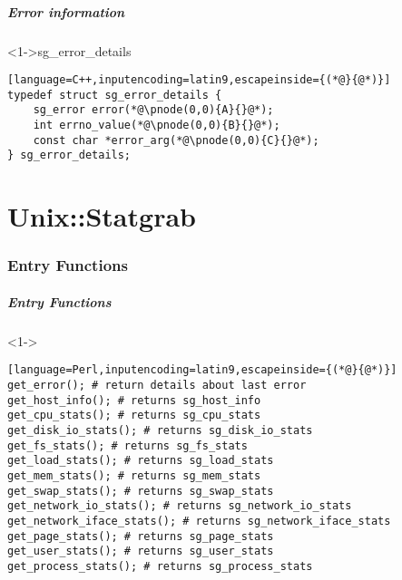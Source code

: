 \documentclass[ngerman,xcolor={table,dvipsnames},smaller,compress,hyperref={bookmarks,colorlinks}]{beamer}
\begin{document}
\begin{frame}[fragile]
\frametitle{Error information}
\begin{block}<1->{sg\_error\_details}
\tiny
\begin{lstlisting}[language=C++,inputencoding=latin9,escapeinside={(*@}{@*)}]
typedef struct sg_error_details {
	sg_error error(*@\pnode(0,0){A}{}@*);
	int errno_value(*@\pnode(0,0){B}{}@*);
	const char *error_arg(*@\pnode(0,0){C}{}@*);
} sg_error_details;
\end{lstlisting}
\end{block}

\scriptsize
{}
\begin{itemize}
\end{itemize}
\end{frame}

\part{Unix::Statgrab}

\section{Entry Functions}

\begin{frame}[fragile]
\frametitle{Entry Functions}
\begin{block}<1->{}
\tiny
\begin{lstlisting}[language=Perl,inputencoding=latin9,escapeinside={(*@}{@*)}]
get_error(); # return details about last error
get_host_info(); # returns sg_host_info
get_cpu_stats(); # returns sg_cpu_stats
get_disk_io_stats(); # returns sg_disk_io_stats
get_fs_stats(); # returns sg_fs_stats
get_load_stats(); # returns sg_load_stats
get_mem_stats(); # returns sg_mem_stats
get_swap_stats(); # returns sg_swap_stats
get_network_io_stats(); # returns sg_network_io_stats
get_network_iface_stats(); # returns sg_network_iface_stats
get_page_stats(); # returns sg_page_stats
get_user_stats(); # returns sg_user_stats
get_process_stats(); # returns sg_process_stats
\end{lstlisting}
\end{block}
\end{frame}
\end{document}
